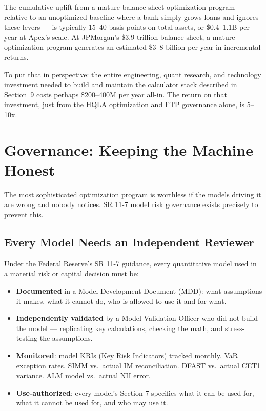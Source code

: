 \documentclass[12pt,a4paper]{article}
\begin{document}
The cumulative uplift from a mature balance sheet optimization program ---
relative to an unoptimized baseline where a bank simply grows loans and
ignores these levers --- is typically 15--40 basis points on total assets,
or \$0.4--1.1B per year at Apex's scale.  At JPMorgan's \$3.9 trillion
balance sheet, a mature optimization program generates an estimated
\$3--8 billion per year in incremental returns.

To put that in perspective: the entire engineering, quant research, and
technology investment needed to build and maintain the calculator stack
described in Section~9 costs perhaps \$200--400M per year all-in.
The return on that investment, just from the HQLA optimization and FTP
governance alone, is 5--10x.

\section{Governance: Keeping the Machine Honest}

The most sophisticated optimization program is worthless if the models driving
it are wrong and nobody notices.  SR 11-7 model risk governance exists
precisely to prevent this.

\subsection{Every Model Needs an Independent Reviewer}

Under the Federal Reserve's SR 11-7 guidance, every quantitative model used
in a material risk or capital decision must be:

\begin{itemize}[noitemsep]
  \item \textbf{Documented} in a Model Development Document (MDD): what
        assumptions it makes, what it cannot do, who is allowed to use it
        and for what.
  \item \textbf{Independently validated} by a Model Validation Officer who
        did not build the model --- replicating key calculations, checking
        the math, and stress-testing the assumptions.
  \item \textbf{Monitored}: model KRIs (Key Risk Indicators) tracked monthly.
        VaR exception rates.  SIMM vs.\ actual IM reconciliation.
        DFAST vs.\ actual CET1 variance.  ALM model vs.\ actual NII error.
  \item \textbf{Use-authorized}: every model's Section 7 specifies what it
        can be used for, what it cannot be used for, and who may use it.
\end{itemize}
\end{document}
